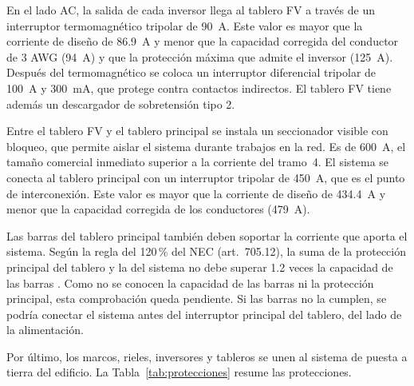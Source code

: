 En el lado AC, la salida de cada inversor llega al tablero FV a través de un interruptor termomagnético tripolar de \SI{90}{A}. Este valor es mayor que la corriente de diseño de \SI{86.9}{A} y menor que la capacidad corregida del conductor de 3 AWG (\SI{94}{A}) y que la protección máxima que admite el inversor (\SI{125}{A}). Después del termomagnético se coloca un interruptor diferencial tripolar de \SI{100}{A} y \SI{300}{mA}, que protege contra contactos indirectos. El tablero FV tiene además un descargador de sobretensión tipo 2.

Entre el tablero FV y el tablero principal se instala un seccionador visible con bloqueo, que permite aislar el sistema durante trabajos en la red. Es de \SI{600}{A}, el tamaño comercial inmediato superior a la corriente del tramo~4. El sistema se conecta al tablero principal con un interruptor tripolar de \SI{450}{A}, que es el punto de interconexión. Este valor es mayor que la corriente de diseño de \SI{434.4}{A} y menor que la capacidad corregida de los conductores (\SI{479}{A}).

Las barras del tablero principal también deben soportar la corriente que aporta el sistema. Según la regla del 120\,\% del NEC (art.\ 705.12), la suma de la protección principal del tablero y la del sistema no debe superar 1.2 veces la capacidad de las barras \cite{nec2014}. Como no se conocen la capacidad de las barras ni la protección principal, esta comprobación queda pendiente. Si las barras no la cumplen, se podría conectar el sistema antes del interruptor principal del tablero, del lado de la alimentación.

Por último, los marcos, rieles, inversores y tableros se unen al sistema de puesta a tierra del edificio. La Tabla~\ref{tab:protecciones} resume las protecciones.


